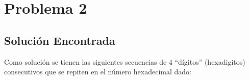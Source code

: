 \documentclass[12pt]{article}
\begin{document}

\newpage
\section{Problema 2}

\subsection{Solución Encontrada}

Como solución se tienen las siguientes secuencias de 4 “dígitos” (hexadigitos) consecutivos que se repiten en el número hexadecimal dado:
\end{document}
